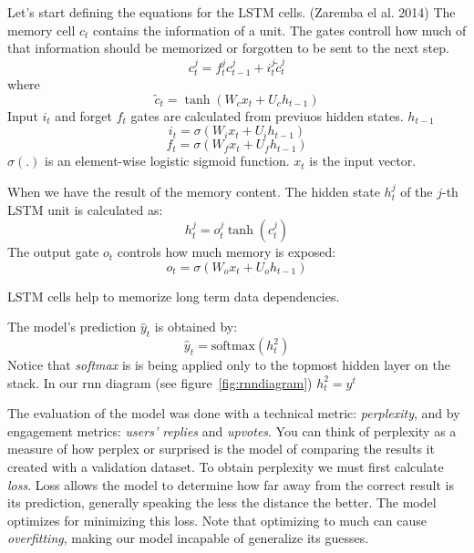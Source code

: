 \documentclass{article} %
\begin{document}
Let's start defining the equations for the LSTM cells. (Zaremba el al. 2014)
The memory cell $c_t$ contains the information of a unit. The gates controll how
much of that information should be memorized or forgotten to be sent to the next
step.
\begin{equation}
c^j_t = f^j_t c^j_{t-1} + i^j_t \widetilde{c}^j_t
\end{equation}
where
\begin{equation}
\widetilde{c}_t = \tanh{(W_c x_t + U_c h_{t-1})}
\end{equation}
Input $i_t$ and forget $f_t$ gates are calculated from previuos hidden states.
$h_{t-1}$
\begin{equation}
i_t = \sigma{(W_i x_t + U_i h_{t-1})}
\end{equation}
\begin{equation}
f_t = \sigma{(W_f x_t + U_f h_{t-1})}
\end{equation}
$\sigma{(.)}$ is an element-wise logistic sigmoid function. $x_t$ is the input
vector.

When we have the result of the memory content. The hidden state $h^j_t$ of the
$j$-th LSTM unit is calculated as:
\begin{equation}
h^j_t = o^j_t \tanh{(c^j_t)}
\end{equation}
The output gate $o_t$ controls how much memory is exposed:
\begin{equation}
o_t = \sigma{(W_o x_t + U_o h_{t-1})}
\end{equation}

LSTM cells help to memorize long term data dependencies.

The model's prediction $\hat{y}_t$ is obtained by:
\begin{equation}
\hat{y}_t = \textrm{softmax} (h^2_t)
\end{equation}
Notice that \textit{softmax} is is being applied only to the topmost hidden
layer on the stack.  In our rnn diagram (see figure~\ref{fig:rnndiagram}) $h^2_t
= y^t$

The evaluation of the model was done with a technical metric:
\textit{perplexity}, and by engagement metrics: \textit{users' replies} and
\textit{upvotes}. You can think of perplexity as a measure of how perplex or
surprised is the model of comparing the results it created with a validation
dataset. To obtain perplexity we must first calculate \textit{loss}. Loss allows
the model to determine how far away from the correct result is its
prediction, generally speaking the less the distance the better. The model
optimizes for minimizing this loss. Note that optimizing to much can cause
\textit{overfitting}, making our model incapable of generalize its guesses.
\end{document}
